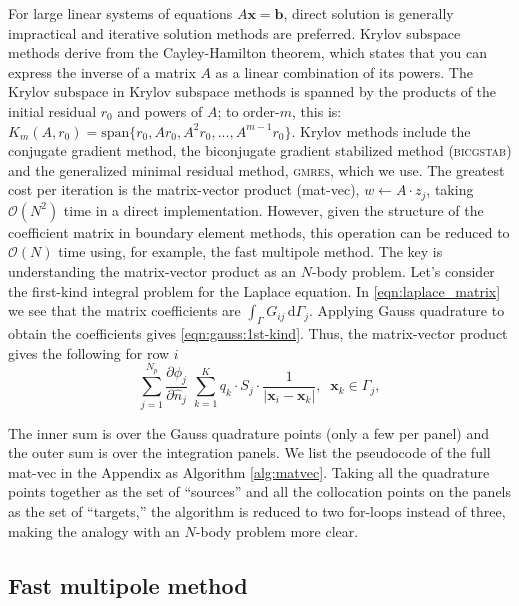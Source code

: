 \documentclass[final,3p,times]{elsarticle}
\renewcommand{\O}[1]{\mathcal{O}(#1)}
\newcommand{\gmres}{\textsc{gmres}\xspace}
\newcommand{\di}[1]{\text{d}#1}
\newcommand{\partiald}[2]{\frac{\partial #1}{\partial #2}}
\newcommand{\nhat}{\hat{n}}
\newcommand{\vect}[1]{\mathbf{#1}}
\begin{document}
For large linear systems of equations $A\vect{x}=\vect{b}$, direct solution is generally impractical and iterative solution methods are preferred. Krylov subspace methods derive from the Cayley-Hamilton theorem, which states that you can express the inverse of a  matrix $A$ as a linear combination of its powers. The Krylov subspace in Krylov subspace methods is spanned by the products of the initial residual $r_0$ and powers of $A$; to order-$m$, this is: $K_{m}(A,r_0) = \text{span}\{ r_0, Ar_0, A^{2}r_0, ..., A^{m-1}r_0\}$.
Krylov methods include the conjugate gradient method, the biconjugate gradient stabilized method (\textsc{bicgstab}) and the generalized minimal residual method, \gmres \cite{SaadSchultz1986}, which we use. The greatest cost per iteration is the matrix-vector product (mat-vec), $w\gets A\cdot z_j$, taking $\O{N^{2}}$ time in a direct implementation. However, given the structure of the coefficient matrix in boundary element methods, this operation can be reduced to $\O{N}$ time using, for example, the fast multipole method.
The key is understanding the matrix-vector product as an $N$-body problem. Let's consider the first-kind integral problem for the Laplace equation. In \eqref{eqn:laplace_matrix} we see that the matrix coefficients are $\int_{\Gamma} G_{ij}\,\di{\Gamma_j}$. Applying Gauss quadrature to obtain the coefficients gives \eqref{eqn:gauss:1st-kind}. Thus, the matrix-vector product gives the following  for row $i$
%
\begin{equation}\label{eqn:matvec-onerow}
	\sum_{j=1}^{N_p}  \partiald{\phi_j}{\nhat_j}\; \sum_{k=1}^{K} q_k\cdot S_j\cdot \frac{1}{|\vect{x}_i-\vect{x}_k|},\;\;\vect{x}_k \in \Gamma_j, 
\end{equation}

\noindent
The inner sum is over the Gauss quadrature points (only a few per panel) and the outer sum is over the integration panels. We list the pseudocode of the full mat-vec in the Appendix as Algorithm \ref{alg:matvec}. Taking all the quadrature points together as the set of ``sources'' and all the collocation points on the panels as the set of ``targets,'' the algorithm is reduced to two for-loops instead of three, making the analogy with an $N$-body problem more clear.


\subsection{Fast multipole method}
\end{document}

